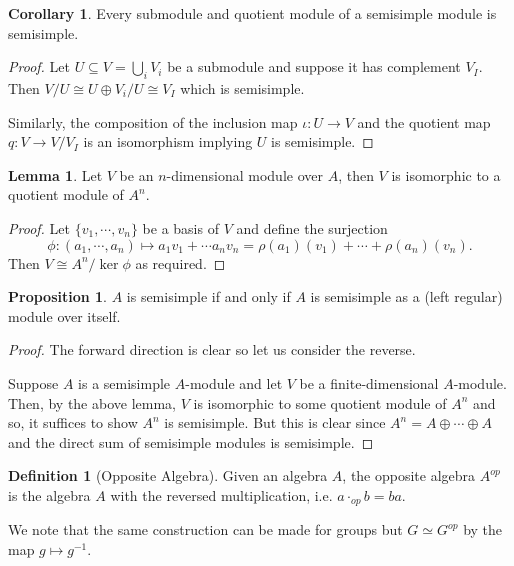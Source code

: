 \documentclass[]{article}
\theoremstyle{definition}
\newtheorem{corollary}{Corollary}[theorem]
\theoremstyle{definition}
\newtheorem{definition}{Definition}[section]
\newtheorem{lemma}{Lemma}[section]
\newtheorem{proposition}{Proposition}[section]
\begin{document}
\begin{corollary}
  Every submodule and quotient module of a semisimple module is semisimple.
\end{corollary}
\begin{proof}
  Let \(U \subseteq V = \bigcup_i V_i\) be a submodule and suppose it has complement 
  \(V_I\). Then \(V / U \cong U \oplus V_i / U \cong V_I\) which is semisimple.

  Similarly, the composition of the inclusion map \(\iota : U \to V\) and the 
  quotient map \(q : V \to V / V_I\) is an isomorphism implying \(U\) is semisimple.
\end{proof}

\begin{lemma}
  Let \(V\) be an \(n\)-dimensional module over \(A\), then \(V\) is isomorphic 
  to a quotient module of \(A^n\).
\end{lemma}
\begin{proof}
  Let \(\{v_1, \cdots, v_n\}\) be a basis of \(V\) and define the surjection 
  \[\phi : (a_1, \cdots, a_n) \mapsto a_1 v_1 + \cdots a_n v_n = 
    \rho(a_1)(v_1) + \cdots + \rho(a_n)(v_n).\]
  Then \(V \cong A^n / \ker \phi\) as required.
\end{proof}

\begin{proposition}
  \(A\) is semisimple if and only if \(A\) is semisimple as a 
  (left regular) module over itself.
\end{proposition}
\begin{proof}
  The forward direction is clear so let us consider the reverse. 

  Suppose \(A\) is a semisimple \(A\)-module and let \(V\) be a finite-dimensional 
  \(A\)-module. Then, by the above lemma, \(V\) is isomorphic to 
  some quotient module of \(A^n\) and so, it suffices to show \(A^n\) is 
  semisimple. But this is clear since \(A^n = A \oplus \cdots \oplus A\) and 
  the direct sum of semisimple modules is semisimple.
\end{proof}

\begin{definition}[Opposite Algebra]
  Given an algebra \(A\), the opposite algebra \(A^{op}\) is the algebra 
  \(A\) with the reversed multiplication, i.e. \(a \cdot_{op} b = ba\).
\end{definition}

We note that the same construction can be made for groups but \(G \simeq G^{op}\) 
by the map \(g \mapsto g^{-1}\).
\end{document}
